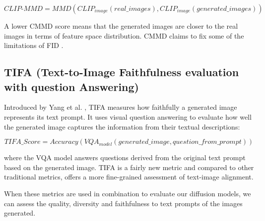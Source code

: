 \documentclass{article}
\begin{document}
\begin{equation}
    CLIP\text{-}MMD = MMD(CLIP_{image}(real\_images), CLIP_{image}(generated\_images))
\end{equation}

A lower CMMD score means that the generated images are closer to the real images in terms of feature space distribution. CMMD claims to 
fix some of the limitations of FID \cite{rethinkingFID2024}.

\subsection{TIFA (Text-to-Image Faithfulness evaluation with question Answering)}

Introduced by Yang et al. \cite{yang2022empirical}, TIFA measures how faithfully a generated image represents its text prompt.
It uses visual question answering to evaluate how well the generated image captures the information from their textual descriptions:

\begin{equation}
    TIFA\_Score = Accuracy(VQA_{model}(generated\_image, question\_from\_prompt))
\end{equation}

where the VQA model answers questions derived from the original text prompt based on the generated image. 
TIFA is a fairly new metric and compared to other traditional metrics, offers a more fine-grained assessment of text-image alignment.

When these metrics are used in combination to evaluate our diffusion models, we can assess the quality, diversity and faithfulness
to text prompts of the images generated.



\end{document}
